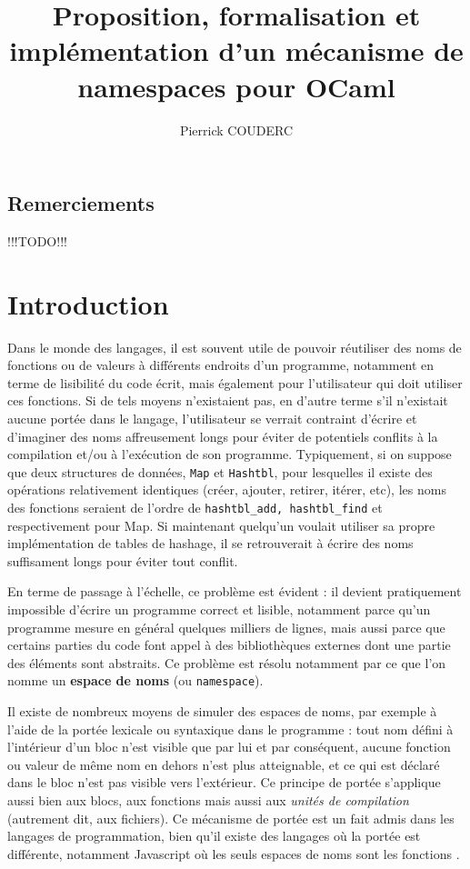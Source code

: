 \documentclass[11pt,a4paper]{report}
\title{Proposition, formalisation et implémentation d'un mécanisme de namespaces
  pour OCaml}
\author{Pierrick COUDERC}
\begin{document}
\maketitle

\section*{Remerciements}

!!!TODO!!!

\tableofcontents

\chapter{Introduction}

Dans le monde des langages, il est souvent utile de pouvoir réutiliser des noms
de fonctions ou de valeurs à différents endroits d'un programme, notamment en
terme de lisibilité du code écrit, mais également pour l'utilisateur qui doit
utiliser ces fonctions. Si de tels moyens n'existaient pas, en d'autre terme
s'il n'existait aucune portée dans le langage, l'utilisateur se verrait
contraint d'écrire et d'imaginer des noms affreusement longs pour éviter de
potentiels conflits à la compilation et/ou à l'exécution de son
programme. Typiquement, si on suppose que deux structures de données,
\texttt{Map} et \texttt{Hashtbl}, pour lesquelles il existe des opérations
relativement identiques (créer, ajouter, retirer, itérer, etc), les noms des
fonctions seraient de l'ordre de \texttt{hashtbl\_add, hashtbl\_find} et
respectivement pour Map. Si maintenant quelqu'un voulait utiliser sa propre
implémentation de tables de hashage, il se retrouverait à écrire des noms
suffisament longs pour éviter tout conflit.

En terme de passage à l'échelle, ce problème est évident : il devient
pratiquement impossible d'écrire un programme correct et lisible, notamment
parce qu'un programme mesure en général quelques milliers de lignes, mais aussi
parce que certains parties du code font appel à des bibliothèques externes dont
une partie des éléments sont abstraits. Ce problème est résolu notamment par ce
que l'on nomme un \textbf{espace de noms} (ou \texttt{namespace}).

Il existe de nombreux moyens de simuler des espaces de noms, par exemple à
l'aide de la portée lexicale ou syntaxique dans le programme : tout nom défini à
l'intérieur d'un bloc n'est visible que par lui et par conséquent, aucune
fonction ou valeur de même nom en dehors n'est plus atteignable, et ce qui est
déclaré dans le bloc n'est pas visible vers l'extérieur. Ce principe de portée
s'applique aussi bien aux blocs, aux fonctions mais aussi aux \emph{unités de
  compilation} (autrement dit, aux fichiers). Ce mécanisme de portée est un fait
admis dans les langages de programmation, bien qu'il existe des langages où la
portée est différente, notamment Javascript où les seuls espaces de noms sont
les fonctions \cite{EcmaScript}.
\end{document}

